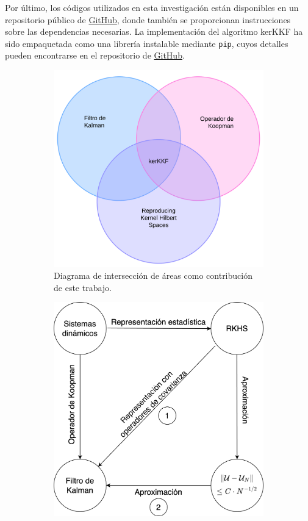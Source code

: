 Por último, los códigos utilizados en esta investigación están disponibles en un repositorio público de \href{https://github.com/diegoolguinw/Koopman_nonlinear_filter}{GitHub}, donde también se proporcionan instrucciones sobre las dependencias necesarias. La implementación del algoritmo kerKKF ha sido empaquetada como una librería instalable mediante \texttt{pip}, cuyos detalles pueden encontrarse en el repositorio de \href{https://github.com/diegoolguinw/kkf}{GitHub}.

\begin{figure}[h]
    \centering
    \begin{subfigure}[b]{0.45\linewidth}
        \includegraphics[width=0.9\linewidth]{img/content/chapter1/Venn_Diagram_Thesis.pdf}
        \caption{Diagrama de intersección de áreas como contribución de este trabajo.}
        \label{fig:venn_diagram}
    \end{subfigure}
    \begin{subfigure}[b]{0.45\linewidth}
        \includegraphics[width=0.9\linewidth]{img/content/chapter1/diag_contri.png}

\end{subfigure}
\end{figure}

